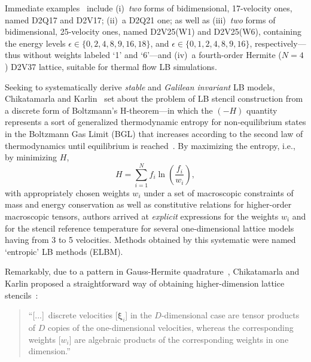     Immediate examples~\cite{2006-PhilippiPC+SurmasR-PhysRevE} include (i)~\emph{two} forms of bidimensional, 17-velocity  ones,
    named D2Q17 and D2V17; (ii)~a D2Q21 one; as well  as  (iii)~\emph{two}  forms  of  bidimensional,  25-velocity  ones,  named
    D2V25(W1) and D2V25(W6), containing the energy levels $\epsilon \in \{0, 2, 4, 8, 9, 16, 18\}$, and $\epsilon \in \{0, 1, 2,
    4, 8, 9, 16\}$, respectively---thus without weights labeled `1' and `6'---and  (iv)~a  fourth-order  Hermite  ($N=4$)  D2V37
    lattice, suitable for thermal flow LB simulations.

    Seeking  to  systematically   derive   \emph{stable}   and   \emph{Galilean   invariant}   LB   models,   Chikatamarla   and
    Karlin~\cite{2006-ChikatamarlaSS+KarlinIV-PhysRevLett} set about the problem of LB stencil construction from a discrete form
    of Boltzmann's H-theorem---in which the  $(-H)$  quantity  represents  a  sort  of  generalized  thermodynamic  entropy  for
    non-equilibrium states in the Boltzmann Gas Limit (BGL) that increases according to the second law of  thermodynamics  until
    equilibrium is reached~\cite{2011-HarrisS-Dover}. By maximizing the entropy, i.e., by minimizing $H$,
    \begin{equation}
        H = \sum_{i=1}^{N}f_i\ln\left(\frac{f_i}{w_i}\right),
    \end{equation}
    \noindent with appropriately chosen weights $w_i$ under a set of macroscopic constraints of mass and energy conservation  as
    well as constitutive relations for higher-order macroscopic tensors, authors arrived at \emph{explicit} expressions for  the
    weights $w_i$ and for the stencil reference temperature for several one-dimensional  lattice  models  having  from  3  to  5
    velocities. Methods obtained by this systematic were named `entropic' LB methods (ELBM).

    Remarkably, due to a pattern in Gauss-Hermite  quadrature~\cite{2003-AnsumaliS+OettingerHC-EuroPhysLett},  Chikatamarla  and
    Karlin       proposed       a       straightforward       way       of       obtaining       higher-dimension        lattice
    stencils~\cite{2006-ChikatamarlaSS+KarlinIV-PhysRevLett}:

    \begin{quote}
        \swshape
        ``[...]~discrete velocities [$\pmb{\xi}_i$] in the $D$-dimensional case  are  tensor  products  of  $D$  copies  of  the
        one-dimensional velocities, whereas the corresponding weights  [$w_i$]  are  algebraic  products  of  the  corresponding
        weights in one dimension.''
    \end{quote}

